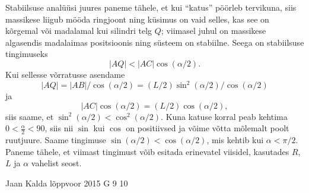 \documentclass[11pt]{article}
\begin{document}
{{\begin{center}
\end{center}

Stabiilsuse analüüsi juures paneme tähele, et kui \enquote{katus} pöörleb tervikuna, siis massikese liigub mööda ringjoont ning küsimus on vaid selles, kas see on kõrgemal või madalamal kui silindri telg $Q$; viimasel juhul on massikese algasendis madalaimas positsioonis ning süsteem on stabiilne. Seega on stabiilsuse tingimuseks
$$|AQ|<|AC|\cos(\alpha/2).$$
Kui sellesse võrratusse asendame
$$|AQ|=|AB|/\cos(\alpha/2)=(L/2)\sin^2(\alpha/2)/\cos(\alpha/2)$$
ja $$|AC|\cos(\alpha/2)=(L/2)\cos(\alpha/2),$$ siis
saame, et $\sin^2(\alpha/2) < \cos^2(\alpha/2)$. Kuna katuse korral peab kehtima $0<\frac{\alpha}{2}<90$, siis nii $\sin$ kui $\cos$ on positiivsed ja võime võtta mõlemalt poolt ruutjuure. Saame tingimuse $\sin(\alpha/2) < \cos(\alpha/2)$, mis kehtib kui $\alpha<\pi/2$. Paneme tähele, et viimast tingimust võib esitada erinevatel viisidel, kasutades $R$, $L$ ja $\alpha$ vahelist seost.
\fi
}

{Jaan Kalda} %
{lõppvoor} %
{2015} %
{G 9} %
{10} %
{

}}
\end{document}
